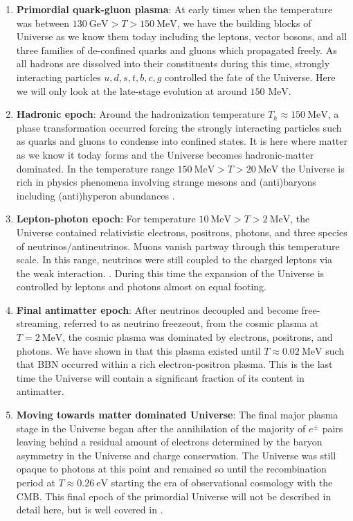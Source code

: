 \documentclass[universe,article,submit,moreauthors,pdftex,a4paper]{Definitions/mdpi}
\newcommand{\MeV}{\text{ MeV}}
\begin{document}
\begin{enumerate}
  \item \textbf{Primordial quark-gluon plasma}: At early times when the temperature was between $130\ \mathrm{GeV}>T>150\ \mathrm{MeV}$, we have the building blocks of Universe as we know them today including the leptons, vector bosons, and all three families of de-confined quarks and gluons which propagated freely. As all hadrons are dissolved into their constituents during this time, strongly interacting particles $u,d,s,t,b,c,g$ controlled the fate of the Universe. Here we will only look at the late-stage evolution at around $150\MeV$.
  \item \textbf{Hadronic epoch}: Around the hadronization temperature $T_h\approx150\ \mathrm{MeV}$, a phase transformation occurred forcing the strongly interacting particles such as quarks and gluons to condense into confined states. It is here where matter as we know it today forms and the Universe becomes hadronic-matter dominated. In the temperature range $ 150\ \mathrm{MeV}>T>20\ \mathrm{MeV}$ the Universe is rich in physics phenomena involving strange mesons and (anti)baryons including (anti)hyperon abundances \cite{Fromerth:2012fe,Yang:2021bko}.
  \item  \textbf{Lepton-photon epoch}: For temperature $10\ \mathrm{MeV}>T>2\ \mathrm{MeV}$, the Universe contained relativistic electrons, positrons, photons, and three species of neutrinos/antineutrinos. Muons vanish partway through this temperature scale. In this range, neutrinos were still coupled to the charged leptons via the weak interaction. \cite{Birrell:2012gg}. During this time the expansion of the Universe is controlled by leptons and photons almost on equal footing.
  \item  \textbf{Final antimatter epoch}: After neutrinos decoupled and become free-streaming, referred to as neutrino freezeout, from the cosmic plasma at $T=2\ \mathrm{MeV}$, the cosmic plasma was dominated by electrons, positrons, and photons. We have shown in \cite{Chris:2023abc} that this plasma existed until $T\approx0.02\ \mathrm{MeV}$ such that BBN occurred within a rich electron-positron plasma. This is the last time the Universe will contain a significant fraction of its content in antimatter.
  \item \textbf{Moving towards matter dominated Universe}: The final major plasma stage in the Universe began after the annihilation of the majority of $e^{\pm}$ pairs leaving behind a residual amount of electrons determined by the baryon asymmetry in the Universe and charge conservation. The Universe was still opaque to photons at this point and remained so until the recombination period at $T\approx0.26\ \mathrm{eV}$ starting the era of observational cosmology with the CMB. This final epoch of the primordial Universe will not be described in detail here, but is well covered in \cite{Planck:2018vyg}.
\end{enumerate}
\end{document}
